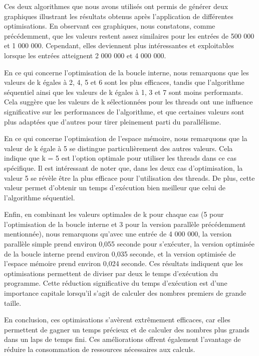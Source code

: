 \documentclass[
    ]{article}
\begin{document}
Ces deux algorithmes que nous avons utilisés ont permis de générer deux
graphiques illustrant les résultats obtenus après l'application de
différentes optimisations. En observant ces graphiques, nous constatons,
comme précédemment, que les valeurs restent assez similaires pour les
entrées de 500 000 et 1 000 000. Cependant, elles deviennent plus
intéressantes et exploitables lorsque les entrées atteignent 2 000 000
et 4 000 000.

En ce qui concerne l'optimisation de la boucle interne, nous remarquons
que les valeurs de k égales à 2, 4, 5 et 6 sont les plus efficaces,
tandis que l'algorithme séquentiel ainsi que les valeurs de k égales à
1, 3 et 7 sont moins performants. Cela suggère que les valeurs de k
sélectionnées pour les threads ont une influence significative sur les
performances de l'algorithme, et que certaines valeurs sont plus
adaptées que d'autres pour tirer pleinement parti du parallélisme.

En ce qui concerne l'optimisation de l'espace mémoire, nous remarquons
que la valeur de k égale à 5 se distingue particulièrement des autres
valeurs. Cela indique que k = 5 est l'option optimale pour utiliser les
threads dans ce cas spécifique. Il est intéressant de noter que, dans
les deux cas d'optimisation, la valeur 5 se révèle être la plus efficace
pour l'utilisation des threads. De plus, cette valeur permet d'obtenir
un temps d'exécution bien meilleur que celui de l'algorithme séquentiel.

Enfin, en combinant les valeurs optimales de k pour chaque cas (5 pour
l'optimisation de la boucle interne et 3 pour la version parallèle
précédemment mentionnée), nous remarquons qu'avec une entrée de 4 000
000, la version parallèle simple prend environ 0,055 seconde pour
s'exécuter, la version optimisée de la boucle interne prend environ
0,035 seconde, et la version optimisée de l'espace mémoire prend environ
0,024 seconde. Ces résultats indiquent que les optimisations permettent
de diviser par deux le temps d'exécution du programme. Cette réduction
significative du temps d'exécution est d'une importance capitale
lorsqu'il s'agit de calculer des nombres premiers de grande taille.

En conclusion, ces optimisations s'avèrent extrêmement efficaces, car
elles permettent de gagner un temps précieux et de calculer des nombres
plus grands dans un laps de temps fini. Ces améliorations offrent
également l'avantage de réduire la consommation de ressources
nécessaires aux calculs.
\end{document}

